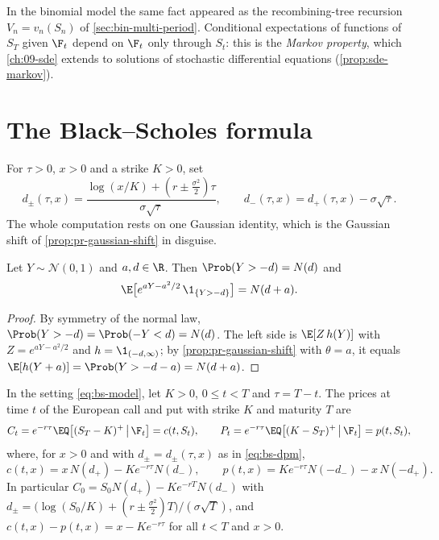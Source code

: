 In the binomial model the same fact appeared as the recombining-tree recursion
$V_n=v_n(S_n)$ of \cref{sec:bin-multi-period}. Conditional expectations of functions of
$S_T$ given $\F_t$ depend on $\F_t$ only through $S_t$: this is the \emph{Markov property}, which
\cref{ch:09-sde} extends to solutions of stochastic differential equations
(\cref{prop:sde-markov}).

\section{The Black--Scholes formula}\label{sec:bs-formula}

For $\tau>0$, $x>0$ and a strike $K>0$, set
\begin{equation}\label{eq:bs-dpm}
  d_\pm(\tau,x)=\frac{\log(x/K)+(r\pm\frac{\sigma^2}{2})\tau}{\sigma\sqrt\tau},\qquad
  d_-(\tau,x)=d_+(\tau,x)-\sigma\sqrt\tau .
\end{equation}
The whole computation rests on one Gaussian identity, which is the Gaussian shift of
\cref{prop:pr-gaussian-shift} in disguise.

\begin{lemma}\label{lem:bs-gaussian}
Let $Y\sim\mathcal N(0,1)$ and $a,d\in\R$. Then $\Prob(Y>-d)=N(d)$ and
\[
  \E\big[e^{aY-a^2/2}\,\1_{\{Y>-d\}}\big]=N(d+a) .
\]
\end{lemma}

\begin{proof}
By symmetry of the normal law, $\Prob(Y>-d)=\Prob(-Y<d)=N(d)$. The left
side is $\E[Z\,h(Y)]$ with $Z=e^{aY-a^2/2}$ and $h=\1_{(-d,\infty)}$; by
\cref{prop:pr-gaussian-shift} with $\theta=a$, it equals $\E[h(Y+a)]=\Prob(Y>-d-a)=N(d+a)$.
\end{proof}

\begin{theorem}\label{thm:bs-formula}
In the setting \eqref{eq:bs-model}, let $K>0$, $0\le t<T$ and $\tau=T-t$. The prices at time
$t$ of the European call and put with strike $K$ and maturity $T$ are
\[
  C_t=e^{-r\tau}\EQ\big[(S_T-K)^+\,\big|\,\F_t\big]=c(t,S_t),\qquad
  P_t=e^{-r\tau}\EQ\big[(K-S_T)^+\,\big|\,\F_t\big]=p(t,S_t),
\]
where, for $x>0$ and with $d_\pm=d_\pm(\tau,x)$ as in \eqref{eq:bs-dpm},
\[
  c(t,x)=x\,N(d_+)-Ke^{-r\tau}N(d_-),\qquad
  p(t,x)=Ke^{-r\tau}N(-d_-)-x\,N(-d_+).
\]
In particular $C_0=S_0N(d_+)-Ke^{-rT}N(d_-)$ with
$d_\pm=\big(\log(S_0/K)+(r\pm\frac{\sigma^2}{2})T\big)/(\sigma\sqrt T)$, and
$c(t,x)-p(t,x)=x-Ke^{-r\tau}$ for all $t<T$ and $x>0$.
\end{theorem}

